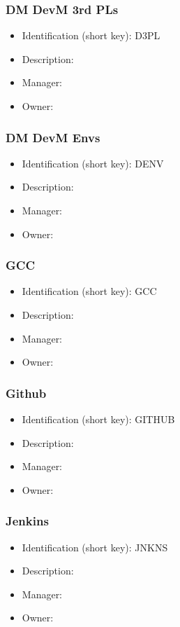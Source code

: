 \subsubsection{DM DevM 3rd PLs}\label{sect:D3PL}
\begin{itemize}
\item Identification (short key): D3PL
\item Description: 
\item Manager: 
\item Owner: 
\end{itemize}

\subsubsection{DM DevM Envs}\label{sect:DENV}
\begin{itemize}
\item Identification (short key): DENV
\item Description: 
\item Manager: 
\item Owner: 
\end{itemize}

\subsubsection{GCC}\label{sect:GCC}
\begin{itemize}
\item Identification (short key): GCC
\item Description: 
\item Manager: 
\item Owner: 
\end{itemize}

\subsubsection{Github}\label{sect:GITHUB}
\begin{itemize}
\item Identification (short key): GITHUB
\item Description: 
\item Manager: 
\item Owner: 
\end{itemize}

\subsubsection{Jenkins}\label{sect:JNKNS}
\begin{itemize}
\item Identification (short key): JNKNS
\item Description: 
\item Manager: 
\item Owner: 
\end{itemize}

